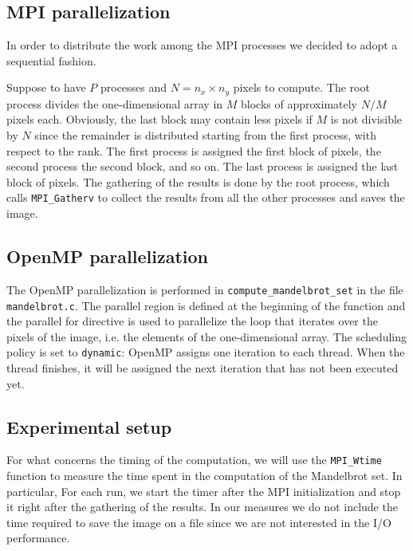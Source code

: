\subsection{MPI parallelization}

In order to distribute the work among the MPI processes we decided to adopt a sequential fashion.

Suppose to have $P$ processes and $N = n_x \times n_y$ pixels to compute. The root process divides the one-dimensional array in $M$ blocks of approximately $N/M$ pixels each. Obviously, the last block may contain less pixels if $M$ is not divisible by $N$ since the remainder is distributed starting from the first process, with respect to the rank. The first process is assigned the first block of pixels, the second process the second block, and so on. The last process is assigned the last block of pixels. The gathering of the results is done by the root process, which calls \texttt{MPI\_Gatherv} to collect the results from all the other processes and saves the image.

\subsection{OpenMP parallelization}

The OpenMP parallelization is performed in \texttt{compute\_mandelbrot\_set} in the file \texttt{mandelbrot.c}. The parallel region is defined at the beginning of the function and the parallel for directive is used to parallelize the loop that iterates over the pixels of the image, i.e. the elements of the one-dimensional array. The scheduling policy is set to \texttt{dynamic}: OpenMP assigns one iteration to each thread. When the thread finishes, it will be assigned the next iteration that has not been executed yet.

\subsection{Experimental setup}

For what concerns the timing of the computation, we will use the \texttt{MPI\_Wtime} function to measure the time spent in the computation of the Mandelbrot set. In particular, For each run, we start the timer after the MPI initialization and stop it right after the gathering of the results. In our measures we do not include the time required to save the image on a file since we are not interested in the I/O performance.


